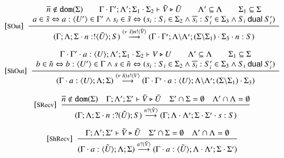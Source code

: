 \begin{figure}
	\[
	\begin{array}{c}
		{\footnotesize [\textrm{SOut}]}~~\displaystyle \frac { 
			\begin{array}{c}
				\overline{n} \notin \mathtt{dom}(\Sigma)
				\qquad 
				\Gamma \cdot \Gamma'; \Lambda'; \Sigma_1 \cdot \Sigma_2 \vdash \tilde{V} \triangleright \tilde{U}
				\qquad
				\Lambda' \subseteq \Lambda
				\qquad
				\Sigma_1 \subseteq \Sigma\\
				a \in \tilde{s} \Leftrightarrow a: \langle U' \rangle \in \Gamma' \wedge
				s_i \in \tilde{s} \Leftrightarrow (s_i: S_i \in \Sigma_2 \wedge \overline{s_i}: S'_i \in \Sigma_3 \wedge S_i \ \mathsf{dual}\  S'_i)
			\end{array}
		 }{ 
			(\Gamma; \Lambda; \Sigma \cdot n: ! \langle \tilde{U} \rangle ; S) \stackrel{(\nu\ \tilde{s}) n ! \langle \tilde{V} \rangle}{\longrightarrow} (\Gamma \cdot \Gamma'; \Lambda\backslash\Lambda'; (\Sigma\backslash\Sigma_1) \cdot \Sigma_3 \cdot n: S)			
		 } 
		\\[8mm]

		{\footnotesize [\textrm{ShOut}]}~~\displaystyle \frac { 
			\begin{array}{c}
				\Gamma \cdot \Gamma' \cdot a: \langle U \rangle; \Lambda'; \Sigma_1 \cdot \Sigma_2 \vdash V \triangleright U
				\qquad
				\Lambda' \subseteq \Lambda
				\qquad
				\Sigma_1 \subseteq \Sigma\\
				b \in \tilde{n} \Leftrightarrow b: \langle U' \rangle \in \Gamma \wedge
				s \in \tilde{n} \Leftrightarrow (s_i: S_i \in \Sigma_2 \wedge \overline{s_i}: S'_i \in \Sigma_3 \wedge S_i \ \mathsf{dual}\  S'_i)
			\end{array}
		 }{ 
			(\Gamma\cdot a: \langle U \rangle; \Lambda; \Sigma) \stackrel{(\nu\ \tilde{n}) s ! \langle V \rangle}{\longrightarrow} (\Gamma \cdot \Gamma'\cdot a: \langle U \rangle; \Lambda\backslash\Lambda'; (\Sigma\backslash\Sigma_1) \cdot \Sigma_3)			
		 } 
		\\[8mm]


		{\footnotesize [\textrm{SRecv}]}~~\displaystyle \frac { 
			\overline{n} \notin \mathtt{dom}(\Sigma) \quad \Gamma; \Lambda'; \Sigma' \vdash \tilde{V} \triangleright \tilde{U}
			\quad
			\Sigma' \cap \Sigma = \emptyset
			\quad
			\Lambda' \cap \Lambda = \emptyset
		 }{ 
			(\Gamma; \Lambda; \Sigma \cdot n: ? (\tilde{U}) ; S) \stackrel{n ? \langle \tilde{V} \rangle}{\longrightarrow} (\Gamma; \Lambda\cdot\Lambda'; \Sigma\cdot\Sigma' \cdot s: S)
		 } 
		\\[8mm]

		{\footnotesize [\textrm{ShRecv}]}~~\displaystyle \frac { 
			\Gamma; \Lambda'; \Sigma' \vdash \tilde{V} \triangleright \tilde{U}
			\quad
			\Sigma' \cap \Sigma = \emptyset \quad \Lambda' \cap \Lambda = \emptyset
		 }{ 
			(\Gamma \cdot a: \tilde{\langle U \rangle}; \Lambda; \Sigma) \stackrel{a ? \langle \tilde{V} \rangle}{\longrightarrow} (\Gamma \cdot a: \tilde{\langle U \rangle}; \Lambda\cdot\Lambda'; \Sigma\cdot\Sigma')
		 } 
		\\[8mm]


\end{array}\]
\end{figure}
